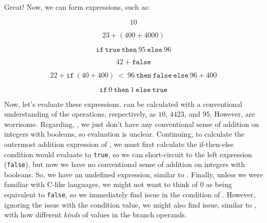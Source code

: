 Great! Now, we can form expressions, such as:

\begin{equation}
      10
      \label{ex:sl:s:good1}
\end{equation}

\begin{equation}
      23 + (400\ \texttt{+}\ 4000)
      \label{ex:sl:s:good2}
\end{equation}

\begin{equation}
      \texttt{if}\ \texttt{true}\ \texttt{then}\ 95\ \texttt{else}\ 96
      \label{ex:sl:s:good3}
\end{equation}

\begin{equation}
      42\ \texttt{+}\ \texttt{false}
      \label{ex:sl:s:bad1}
\end{equation}

\begin{equation}
      22 + \texttt{if}\ (40\ \texttt{+}\ 400)\ <\ 96\ \texttt{then}\ \texttt{false}\ \texttt{else}\ 96\ \texttt{+}\ 400
      \label{ex:sl:s:bad2}
\end{equation}

\begin{equation}
      \texttt{if}\ 0\ \texttt{then}\ 1\ \texttt{else}\ \texttt{true}
      \label{ex:sl:s:bad3}
\end{equation}


Now, let's evaluate these expressions.
 can be calculated with a
conventional understanding of the operations, respectively, as \(10\), \(4423\),
and \(95\). However,  are
worrisome. Regarding, , we just don't have any conventional
sense of addition on integers with booleans, so evaluation is unclear.
Continuing, to calculate the outermost addition expression of
, we must first calculate the if-then-else condition would
evaluate to \texttt{true}, so we can short-circuit to the left expression
(\texttt{false}), but now we have no conventional sense of addition on integers
with booleans. So, we have an undefined expression, similar to
. Finally, unless we were familiar with C-like languages, we
might not want to think of \(0\) as being equivalent to \texttt{false}, so we
immediately find issue in the condition of . However,
ignoring the issue with the condition value, we might also find issue, similar
to , with how different \textit{kinds} of values in the
branch operands.

